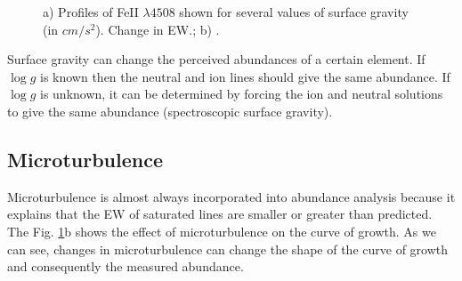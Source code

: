 \documentclass[dvips,12pt,a4paper]{report}
\begin{document}
{\begin{figure}[h]
\centering
\caption[Line Profiles of FeII with $log\,g$ ; Curves of growth dependent of microturbulence] {a) Profiles of FeII $\lambda4508$ shown for several values of surface gravity (in $cm/s^2$). Change in EW.; b) .}
\label{cogpmt}
\end{figure}

Surface gravity can change the perceived abundances of a certain element. If $\log g$  is known then the neutral and ion lines should give the same abundance. If $\log g$ is unknown, it can be determined by forcing the ion and neutral solutions to give the same abundance (spectroscopic surface gravity).

\subsection{Microturbulence}
\label{microturbo}
Microturbulence is almost always incorporated into abundance analysis because it explains that the EW of saturated lines are smaller or greater than predicted. The Fig. \ref{cogpmt}b shows the effect of microturbulence on the curve of growth. As we can see, changes in microturbulence can change the shape of the curve of growth and consequently the measured abundance. 

}
\end{document}
